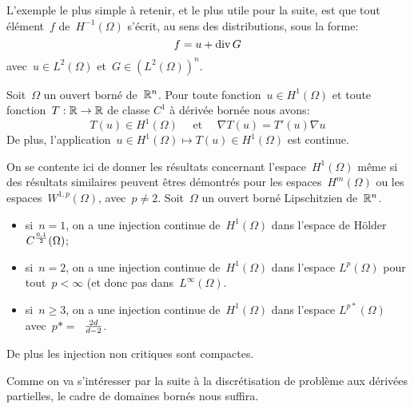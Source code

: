 \bigskip
L'exemple le plus simple à retenir, et le plus utile pour la suite, est que tout élément~$f$
de~$H^{-1}(\Omega)$ s'écrit, au sens des distributions, sous la forme:
\begin{equation}\colorred
f = u + \dive G
\end{equation}
avec~$u \in L^2(\Omega)$ et~$G \in (L^2(\Omega))^n$.
\medskip
\begin{theoreme}
Soit~$\Omega$ un ouvert borné de~$\mathbb R^n$.
Pour toute fonction~$u \in H^1(\Omega)$ et toute fonction~$T: \mathbb R \to \mathbb R$ de classe
$C^1$ à dérivée bornée nous avons:
\begin{equation}
T(u) \in H^1(\Omega)\quad\text{ et }\quad\nabla T(u) = T'(u)\nabla u
\end{equation}
De plus, l'application~$u \in H^1(\Omega) \mapsto T(u) \in H^1(\Omega)$ est continue.
\end{theoreme}
\medskip
On se contente ici de donner les résultats concernant l'espace~$H^1(\Omega)$ même
si des résultats similaires peuvent êtres démontrés pour les espaces~$H^m(\Omega)$
ou les espaces~$W^{1,p}(\Omega)$, avec~$p\ne 2$.
Soit~$\Omega$ un ouvert borné Lipschitzien de~$\mathbb R^n$.
\begin{itemize}
  \item si~$n=1$, on a une injection continue de~$H^1(\Omega)$ dans l'espace de
	H\"older~$C^{0,1\over2}(\Omega)$;
  \item si~$n=2$, on a une injection continue de~$H^1(\Omega)$ dans l'espace
	$L^p(\Omega)$ pour tout~$p<\infty$ (et donc pas dans~$L^\infty(\Omega)$.
  \item si~$n\ge 3$, on a une injection continue de~$H^1(\Omega)$ dans l'espace
	$L^{p*}(\Omega)$ avec~$p*=$~${2d}\over{d-2}$.
\end{itemize}
De plus les injection non critiques sont compactes.

Comme on va s'intéresser par la suite à la discrétisation de problème aux dérivées
partielles, le cadre de domaines bornés nous suffira.

\medskip
